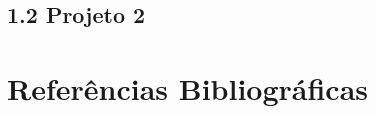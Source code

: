 \documentclass[12pts]{article}
\begin{document}
\subsection{1.2 Projeto 2}

\newpage
\section{Referências Bibliográficas}
\end{document}
